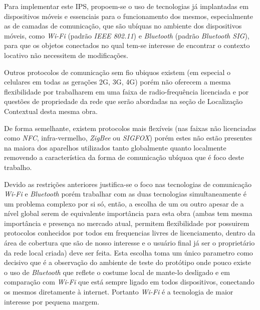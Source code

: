 Para implementar este IPS, propoem-se o uso de tecnologias já implantadas em
dispositivos móveis e essenciais para o funcionamento dos mesmos, especialmente
as de camadas de comunicação, que são ubíquas no ambiente dos dispositivos
móveis, como \textit{Wi-Fi} (padrão \textit{IEEE 802.11}) e \textit{Bluetooth}
(padrão \textit{Bluetooth SIG}), para que os objetos conectados no qual tem-se
interesse de encontrar o contexto locativo não necessitem de modificações.

Outros protocolos de comunicação sem fio ubiquos existem (em especial o
celulares em todas as gerações 2G, 3G, 4G) porém não oferecem a mesma
flexibilidade por trabalharem em uma faixa de radio-frequência licenciada e por
questões de propriedade da rede que serão abordadas na seção de Localização
Contextual desta mesma obra.

De forma semelhante, existem protocolos mais flexíveis (nas faixas não
licenciadas como \textit{NFC}, infra-vermelho, \textit{ZigBee} ou
\textit{SIGFOX}) porém estes não estão presentes na maiora dos aparelhos
utilizados tanto globalmente quanto localmente removendo a característica da
forma de comunicação ubíquoa que é foco deste trabalho.

Devido as restrições anteriores justifica-se o foco nas tecnologias de
comunicação \textit{Wi-Fi} e \textit{Bluetooth} porém trabalhar com as duas
tecnologias simultaneamente é um problema complexo por si só, então, a escolha
de um ou outro apesar de a nível global serem de equivalente importância para
esta obra (ambas tem mesma importância e presença no mercado atual, permitem
flexibilidade por possuirem protocolos conhecidos por todos em frequencias
livres de licenciamento, dentro da área de cobertura que são de nosso interesse
e o usuário final já ser o proprietário da rede local criada) deve ser feita.
Esta escolha toma um único parametro como decisivo que é a observação do
ambiente de teste do protótipo onde pouco existe o uso de \textit{Bluetooth} que
reflete o costume local de mante-lo desligado e em comparação com \textit{Wi-Fi}
que está sempre ligado em todos dispositivos, conectando os mesmos diretamente à
internet. Portanto \textit{Wi-Fi} é a tecnologia de maior interesse por pequena
margem.
